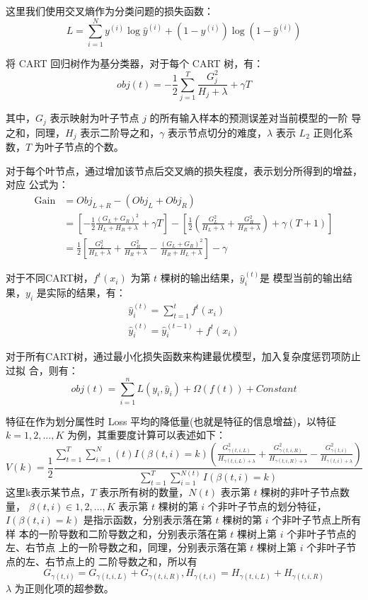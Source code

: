 \documentclass[withoutpreface,bwprint]{cumcmthesis} %
\begin{document}
这里我们使用交叉熵作为分类问题的损失函数：
\[
    L=\sum_{i=1}^Ny^{(i)}\log\widehat{y}^{(i)}+(1-y^{(i)})\log(1-\widehat{y}^{(i)})
\]

将 CART 回归树作为基分类器，对于每个 CART 树，有：
\[
    obj(t)=-\frac{1}{2}\sum_{j=1}^T\frac{G_j^2}{H_j+\lambda}+\gamma T
\]

其中，$G_j$ 表示映射为叶子节点 $j$ 的所有输入样本的预测误差对当前模型的一阶
导之和，同理，$H_j$ 表示二阶导之和，$\gamma$ 表示节点切分的难度，$\lambda$
表示 $L_2$ 正则化系数，$T$ 为叶子节点的个数。

对于每个叶节点，通过增加该节点后交叉熵的损失程度，表示划分所得到的增益，对应
公式为：
\begin{align*}
    \mathrm{Gain} & =Obj_{L+R}-(Obj_L+Obj_R)                                                 \\
                  & =\left[-\frac{1}{2}\frac{(G_L+G_R)^2}{H_L+H_R+\lambda}+\gamma T\right] -
    \left[\frac{1}{2}(\frac{G_L^2}{H_L+\lambda}+\frac{G_R^2}{H_R+\lambda})+
    \gamma(T+1)\right]                                                                       \\
                  & =\frac{1}{2}\left[\frac{G_L^2}{H_L+\lambda}+\frac{G_R^2}{H_R+\lambda}-
        \frac{(G_L+G_R)^2}{H_R+H_L+\lambda}\right]-\gamma
\end{align*}

对于不同CART树，$f^t(x_i)$ 为第 $t$ 棵树的输出结果，$\widehat{y}_i^{(t)}$是
模型当前的输出结果，$y_i$ 是实际的结果，有：
\begin{gather*}
    \widehat{y}_i^{(t)}=\sum_{t=1}^tf^t(x_i) \\
    \widehat{y}_i^{(t)}=\widehat{y}_i^{(t-1)}+f^t(x_i)
\end{gather*}

对于所有CART树，通过最小化损失函数来构建最优模型，加入复杂度惩罚项防止过拟
合，则有：
\[
    obj(t)=\sum_{i=1}^nL(y_i,\widehat{y}_i)+\Omega(f(t))+Constant
\]

特征在作为划分属性时 Loss 平均的降低量(也就是特征的信息增益)，以特征
$k=1,2,...,K$ 为例，其重要度计算可以表述如下：
\begin{equation}
    V(k)=\frac{1}{2}\frac{\displaystyle \sum_{t=1}^T\sum_{i=1}^N(t)
    I(\beta(t,i)=k)(\frac{G^2_{\gamma(t,i,L)}}{H_{\gamma(t,i,L)+\lambda}}+
    \frac{G^2_{\gamma(t,i,R)}}{H_{\gamma(t,i,R)+\lambda}}-
    \frac{G^2_{\gamma(t,i)}}{H_{\gamma(t,i)+\lambda}})}
    {\displaystyle \sum_{t=1}^T\sum_{i=1}^{N(t)}I(\beta(t,i)=k)}
    \label{eq:importanceCalculate}
\end{equation}
\indent 这里k表示某节点，$T$ 表示所有树的数量，$N(t)$ 表示第 $t$ 棵树的非叶子节点数量，
$\beta(t,i)\in 1,2,\dots,K$ 表示第 $t$ 棵树的第 $i$ 个非叶子节点的划分特征，
$I(\beta(t,i)=k)$ 是指示函数，分别表示落在第 $t$ 棵树的第 $i$ 个非叶子节点上所有样
本的一阶导数和二阶导数之和，分别表示落在第 $t$ 棵树上第 $i$ 个非叶子节点的左、右节点
上的一阶导数之和，同理，分别表示落在第 $t$ 棵树上第 $i$ 个非叶子节点的左、右节点上的
二阶导数之和，所以有
\[
    G_{\gamma(t,i)}=G_{\gamma(t,i,L)}+G_{\gamma(t,i,R)},
    H_{\gamma(t,i)}=H_{\gamma(t,i,L)}+H_{\gamma(t,i,R)}
\]
\indent $\lambda$ 为正则化项的超参数。
\end{document}
